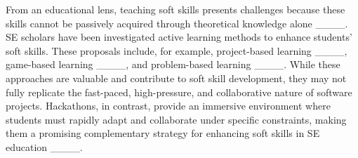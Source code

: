 

From an educational lens, teaching soft skills presents challenges because these skills cannot be passively acquired through theoretical knowledge alone ____. SE scholars have been investigated active learning methods to enhance students' soft skills. These proposals include, for example, project-based learning ____, game-based learning ____, and problem-based learning ____.  While these approaches are valuable and contribute to soft skill development, they may not fully replicate the fast-paced, high-pressure, and collaborative nature of software projects. Hackathons, in contrast, provide an immersive environment where students must rapidly adapt and collaborate under specific constraints, making them a promising complementary strategy for enhancing soft skills in SE education ____.





